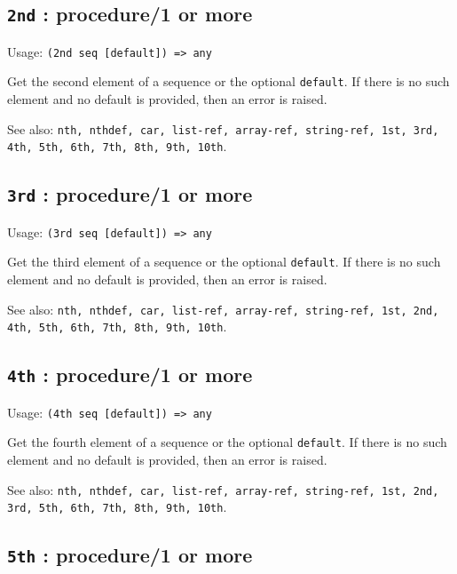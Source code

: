 \documentclass[
]{article}
\newcommand{\passthrough}[1]{#1}
\begin{document}
\hypertarget{nd-procedure1-or-more-1}{%
\subsection{\texorpdfstring{\texttt{2nd} : procedure/1 or
more}{2nd : procedure/1 or more}}\label{nd-procedure1-or-more-1}}

Usage: \passthrough{\lstinline!(2nd seq [default]) => any!}

Get the second element of a sequence or the optional
\passthrough{\lstinline!default!}. If there is no such element and no
default is provided, then an error is raised.

See also:
\passthrough{\lstinline!nth, nthdef, car, list-ref, array-ref, string-ref, 1st, 3rd, 4th, 5th, 6th, 7th, 8th, 9th, 10th!}.

\hypertarget{rd-procedure1-or-more-1}{%
\subsection{\texorpdfstring{\texttt{3rd} : procedure/1 or
more}{3rd : procedure/1 or more}}\label{rd-procedure1-or-more-1}}

Usage: \passthrough{\lstinline!(3rd seq [default]) => any!}

Get the third element of a sequence or the optional
\passthrough{\lstinline!default!}. If there is no such element and no
default is provided, then an error is raised.

See also:
\passthrough{\lstinline!nth, nthdef, car, list-ref, array-ref, string-ref, 1st, 2nd, 4th, 5th, 6th, 7th, 8th, 9th, 10th!}.

\hypertarget{th-procedure1-or-more-8}{%
\subsection{\texorpdfstring{\texttt{4th} : procedure/1 or
more}{4th : procedure/1 or more}}\label{th-procedure1-or-more-8}}

Usage: \passthrough{\lstinline!(4th seq [default]) => any!}

Get the fourth element of a sequence or the optional
\passthrough{\lstinline!default!}. If there is no such element and no
default is provided, then an error is raised.

See also:
\passthrough{\lstinline!nth, nthdef, car, list-ref, array-ref, string-ref, 1st, 2nd, 3rd, 5th, 6th, 7th, 8th, 9th, 10th!}.

\hypertarget{th-procedure1-or-more-9}{%
\subsection{\texorpdfstring{\texttt{5th} : procedure/1 or
more}{5th : procedure/1 or more}}\label{th-procedure1-or-more-9}}
\end{document}
